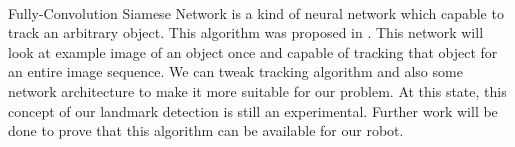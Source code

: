 	\paragraph{}
	Fully-Convolution Siamese Network is a kind of neural network which capable to track an arbitrary object. This algorithm was proposed in \cite{DBLP:journals/corr/BertinettoVHVT16}. This network will look at example image of an object once and capable of tracking that object for an entire image sequence. We can tweak tracking algorithm and also some network architecture to make it more suitable for our problem. At this state, this concept of our landmark detection is still an experimental. Further work will be done to prove that this algorithm can be available for our robot. 
